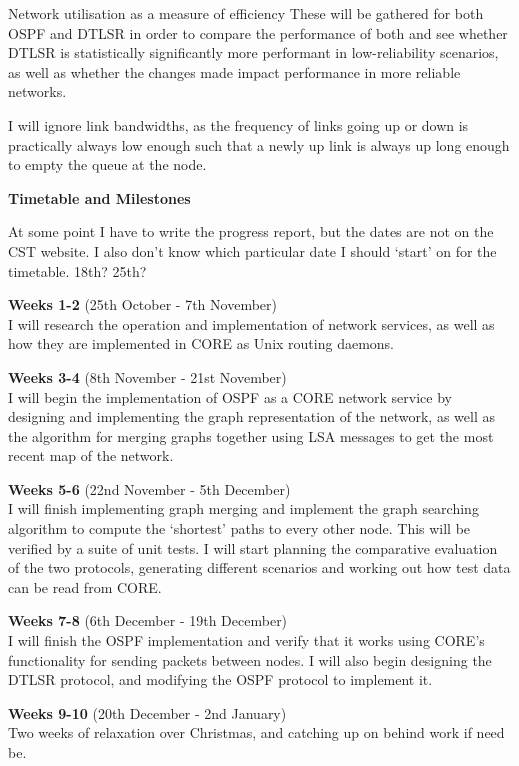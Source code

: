 \documentclass[withindex,glossary,openany]{cam-thesis}
\begin{document}
Network utilisation as a measure of efficiency
These will be gathered for both OSPF and DTLSR in order to compare the performance of both and see whether DTLSR is statistically significantly more performant in low-reliability scenarios, as well as whether the changes made impact performance in more reliable networks.

I will ignore link bandwidths, as the frequency of links going up or down is practically always low enough such that a newly up link is always up long enough to empty the queue at the node.

\vspace{8mm}
\LARGE\textbf{Timetable and Milestones}\normalsize

At some point I have to write the progress report, but the dates are not on the CST website. I also don’t know which particular date I should `start’ on for the timetable. 18th? 25th?

\large\textbf{Weeks 1-2} (25th October - 7th November)\normalsize\\
I will research the operation and implementation of network services, as well as how they are implemented in CORE as Unix routing daemons.

\large\textbf{Weeks 3-4} (8th November - 21st November)\normalsize\\
I will begin the implementation of OSPF as a CORE network service by designing and implementing the graph representation of the network, as well as the algorithm for merging graphs together using LSA messages to get the most recent map of the network.

\large\textbf{Weeks 5-6} (22nd November - 5th December)\normalsize\\
I will finish implementing graph merging and implement the graph searching algorithm to compute the `shortest’ paths to every other node. This will be verified by a suite of unit tests. I will start planning the comparative evaluation of the two protocols, generating different scenarios and working out how test data can be read from CORE.

\large\textbf{Weeks 7-8} (6th December - 19th December)\normalsize\\
I will finish the OSPF implementation and verify that it works using CORE’s functionality for sending packets between nodes. I will also begin designing the DTLSR protocol, and modifying the OSPF protocol to implement it.

\large\textbf{Weeks 9-10} (20th December - 2nd January)\normalsize\\
Two weeks of relaxation over Christmas, and catching up on behind work if need be.
\end{document}

